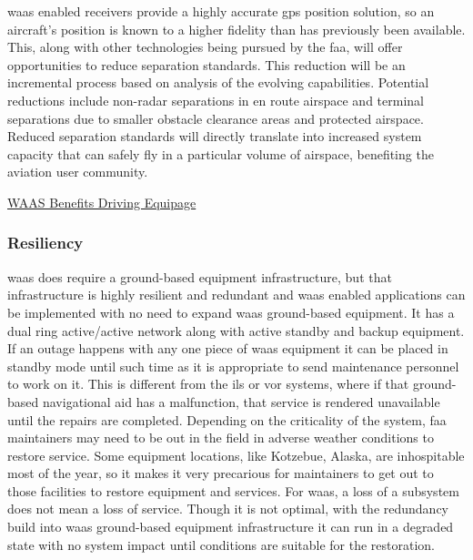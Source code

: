 \ac{waas} enabled receivers provide a highly accurate \ac{gps} position solution,
so an aircraft's position is known to a higher fidelity than has
previously been available. This, along with other technologies being
pursued by the \ac{faa}, will offer opportunities to reduce separation
standards. This reduction will be an incremental process based on
analysis of the evolving capabilities. Potential reductions include
non-radar separations in en route airspace and terminal separations due
to smaller obstacle clearance areas and protected airspace. Reduced
separation standards will directly translate into increased system
capacity that can safely fly in a particular volume of airspace,
benefiting the aviation user community.

\href{https://www.faa.gov/about/office_org/headquarters_offices/ato/service_units/techops/navservices/gnss/library/satnav/media/SatNavNews_Spring2014_final_web.pdf}{WAAS
Benefits Driving Equipage}

\subsubsection{Resiliency}\label{resiliency}

\ac{waas} does require a ground-based equipment infrastructure, but that
infrastructure is highly resilient and redundant and \ac{waas} enabled
applications can be implemented with no need to expand \ac{waas}
ground-based equipment. It has a dual ring active/active network along
with active standby and backup equipment. If an outage happens with any
one piece of \ac{waas} equipment it can be placed in standby mode until such
time as it is appropriate to send maintenance personnel to work on it.
This is different from the \ac{ils} or \ac{vor}
systems, where if that ground-based navigational aid has a malfunction,
that service is rendered unavailable until the repairs are completed.
Depending on the criticality of the system, \ac{faa} maintainers may need to
be out in the field in adverse weather conditions to restore service.
Some equipment locations, like Kotzebue, Alaska, are inhospitable most
of the year, so it makes it very precarious for maintainers to get out
to those facilities to restore equipment and services. For \ac{waas}, a loss
of a subsystem does not mean a loss of service. Though it is not
optimal, with the redundancy build into \ac{waas} ground-based equipment
infrastructure it can run in a degraded state with no system impact
until conditions are suitable for the restoration.


